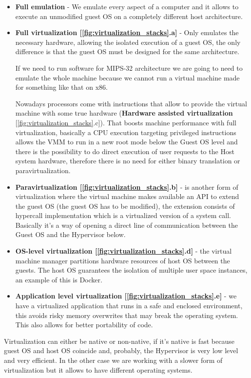 \begin{itemize}
    \item \textbf{Full emulation} - We emulate every aspect of a computer and it allows to execute an unmodified guest OS on a completely different host architecture.
    \item \textbf{Full virtualization [\ref{fig:virtualization_stacks}.a]} - Only emulates the necessary hardware, allowing the isolated execution of a guest OS, the only difference is that the guest OS must be designed for the same architecture.

    If we need to run software for MIPS-32 architecture we are going to need to emulate the whole machine because we cannot run a virtual machine made for something like that on x86.

    Nowadays processors come with instructions that allow to provide the virtual machine with some true hardware (\textbf{Hardware assisted virtualization} [\ref{fig:virtualization_stacks}.c]). That boosts machine performance with full virtualization, basically a CPU execution targeting privileged instructions allows the VMM to run in a new root mode below the Guest OS level and there is the possibility to do direct execution of user requests to the Host system hardware, therefore there is no need for either binary translation or paravirtualization.
    \item \textbf{Paravirtualization [\ref{fig:virtualization_stacks}.b]} - is another form of virtualization where the virtual machine makes available an API to extend the guest OS (the guest OS has to be modified), the extension consists of hypercall implementation which is a virtualized version of a system call. Basically it's a way of opening a direct line of communication between the Guest OS and the Hypervisor below.
    \item \textbf{OS-level virtualization [\ref{fig:virtualization_stacks}.d]} - the virtual machine manager partitions hardware resources of host OS between the guests. The host OS guarantees the isolation of multiple user space instances, an example of this is Docker.
    \item \textbf{Application level virtualization [\ref{fig:virtualization_stacks}.e]} - we have a virtualized application that runs in a safe and enclosed environment, this avoids risky memory overwrites that may break the operating system. This also allows for better portability of code.
\end{itemize}
Virtualization can either be native or non-native, if it's native is fast because guest OS and host OS coincide and, probably, the Hypervisor is very low level and very efficient. In the other case we are working with a slower form of virtualization but it allows to have different operating systems.

